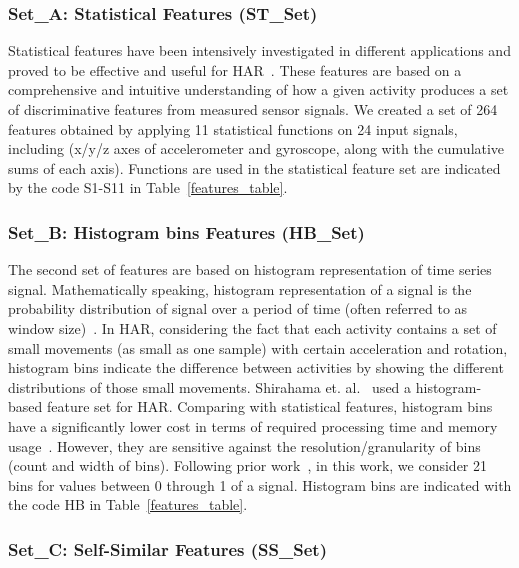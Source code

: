 \documentclass[journal,article,submit,moreauthors,pdftex]{Definitions/mdpi}
\begin{document}
\subsubsection{Set\_A: Statistical Features (ST\_Set)}
Statistical features have been intensively investigated in different applications and proved to be effective and useful for HAR~\cite{rosati2018comparison}. These features are based on a comprehensive and intuitive understanding of how a given activity produces a set of discriminative features from measured sensor signals. We created a set of 264 features obtained by applying 11 statistical functions on 24 input signals, including (x/y/z axes of accelerometer and gyroscope, along with the cumulative sums of each axis). Functions are used in the statistical feature set are indicated by the code S1-S11 in Table~\ref{features_table}. 

\subsubsection{Set\_B: Histogram bins Features (HB\_Set)}
The second set of features are based on histogram representation of time series signal. Mathematically speaking, histogram representation of a signal is the probability distribution of signal over a period of time (often referred to as window size)~\cite{zardoshti1995emg}. In HAR, considering the fact that each activity contains a set of small movements (as small as one sample) with certain acceleration and rotation, histogram bins indicate the difference between activities by showing the different distributions of those small movements. Shirahama et. al.~\cite{shirahama2016codebook} used a histogram-based feature set for HAR. Comparing with statistical features, histogram bins have a significantly lower cost in terms of required processing time and memory usage~\cite{Sarbishei2019platform}. However, they are sensitive against the resolution/granularity of bins (count and width of bins). Following prior work~\cite{xi2017evaluation}, in this work, we consider 21 bins for values between 0 through 1 of a signal. Histogram bins are indicated with the code HB in Table~\ref{features_table}.

\subsubsection{Set\_C: Self-Similar Features (SS\_Set)}
\end{document}
